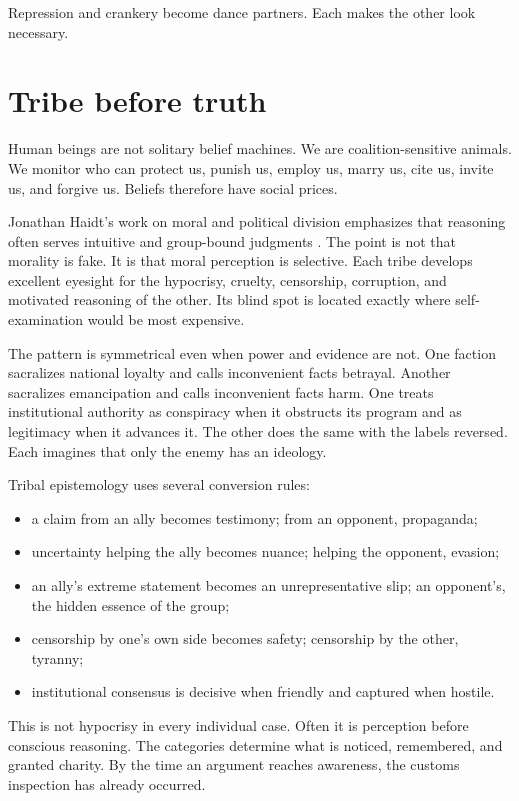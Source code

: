 ﻿\documentclass[12pt,a4paper]{book}
\begin{document}
Repression and crankery become dance partners. Each makes the other look necessary.

\section{Tribe before truth}

Human beings are not solitary belief machines. We are coalition-sensitive animals. We monitor who can protect us, punish us, employ us, marry us, cite us, invite us, and forgive us. Beliefs therefore have social prices.

Jonathan Haidt's work on moral and political division emphasizes that reasoning often serves intuitive and group-bound judgments \cite{Haidt-righteous-mind}. The point is not that morality is fake. It is that moral perception is selective. Each tribe develops excellent eyesight for the hypocrisy, cruelty, censorship, corruption, and motivated reasoning of the other. Its blind spot is located exactly where self-examination would be most expensive.

The pattern is symmetrical even when power and evidence are not. One faction sacralizes national loyalty and calls inconvenient facts betrayal. Another sacralizes emancipation and calls inconvenient facts harm. One treats institutional authority as conspiracy when it obstructs its program and as legitimacy when it advances it. The other does the same with the labels reversed. Each imagines that only the enemy has an ideology.

Tribal epistemology uses several conversion rules:

\begin{itemize}
  \item a claim from an ally becomes testimony; from an opponent, propaganda;
  \item uncertainty helping the ally becomes nuance; helping the opponent, evasion;
  \item an ally's extreme statement becomes an unrepresentative slip; an opponent's, the hidden essence of the group;
  \item censorship by one's own side becomes safety; censorship by the other, tyranny;
  \item institutional consensus is decisive when friendly and captured when hostile.
\end{itemize}

This is not hypocrisy in every individual case. Often it is perception before conscious reasoning. The categories determine what is noticed, remembered, and granted charity. By the time an argument reaches awareness, the customs inspection has already occurred.
\end{document}
